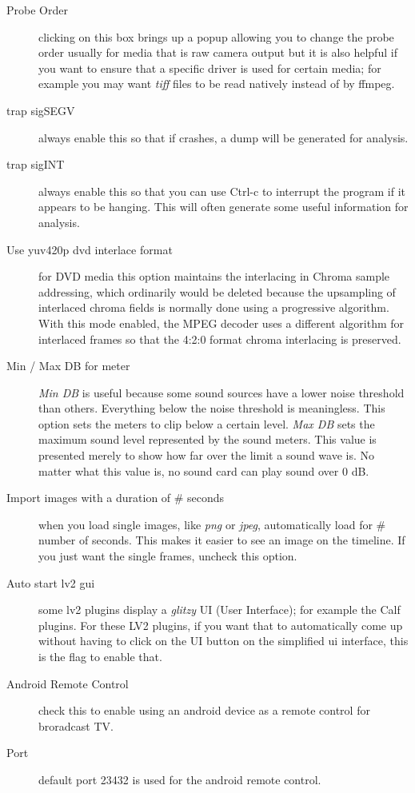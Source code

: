 \begin{description}
    \item[Probe Order] clicking on this box brings up a popup allowing you to change the probe order usually for media that is raw camera output but it is also helpful if you want to ensure that a specific driver is used for certain media; for example you may want \textit{tiff} files to be read natively instead of by ffmpeg.
    \item[trap sigSEGV] always enable this so that if \CGG{} crashes, a dump will be generated for analysis.
    \item[trap sigINT] always enable this so that you can use Ctrl-c to interrupt the program if it appears to be hanging.  This will often generate some useful information for analysis.
    \item[Use yuv420p dvd interlace format] for DVD media this option maintains the interlacing in Chroma sample addressing, which ordinarily would be deleted because the upsampling of interlaced chroma fields is normally done using a progressive algorithm.  With this mode enabled, the MPEG decoder uses a different algorithm for interlaced frames so that the 4:2:0 format chroma interlacing is preserved.
    \item[Min / Max DB for meter] \textit{Min DB} is useful because some sound sources have a lower noise threshold than others. Everything below the noise threshold is meaningless. This option sets the meters to clip below a certain level.  \textit{Max DB} sets the maximum sound level represented by the sound meters. This value is presented merely to show how far over the limit a sound wave is. No matter what this value is, no sound card can play sound over 0 dB.
    \item[Import images with a duration of \# seconds] when you load single images, like \textit{png} or \textit{jpeg}, automatically load for \# number of seconds.  This makes it easier to see an image on the timeline.  If you just want the single frames, uncheck this option.
    \item[Auto start lv2 gui] some lv2 plugins display a \textit{glitzy} UI (User Interface); for example the Calf plugins.  For these LV2 plugins, if you want that to automatically come up without having to click on the UI button on the simplified ui interface, this is the flag to enable that.
    \item[Android Remote Control] check this to enable using an android device as a remote control for broradcast TV.
    \item[Port] default port 23432 is used for the android remote control.

\end{description}
